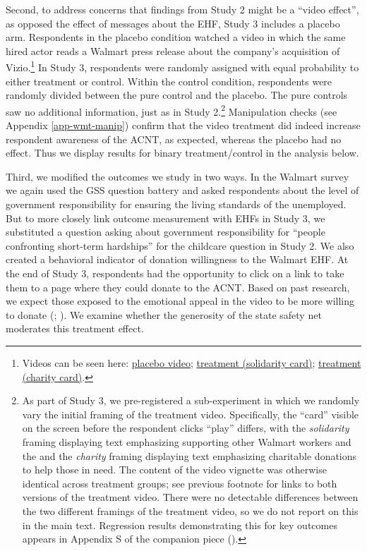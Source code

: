 \documentclass[
  11pt,
  oneside]{article}
\begin{document}
Second, to address concerns that findings from Study 2 might be a ``video effect'', as opposed the effect of messages about the EHF, Study 3 includes a placebo arm. Respondents in the placebo condition watched a video in which the same hired actor reads a Walmart press release about the company's acquisition of Vizio.\footnote{Videos can be seen here: \href{https://tinyurl.com/EHF-Study3-placebo}{placebo video}; \href{https://tinyurl.com/EHFStudy3-solidarity}{treatment (solidarity card)}; \href{https://tinyurl.com/EHF-Study3-charity}{treatment (charity card)}.} In Study 3, respondents were randomly assigned with equal probability to either treatment or control. Within the control condition, respondents were randomly divided between the pure control and the placebo. The pure controls saw no additional information, just as in Study 2.\footnote{As part of Study 3, we pre-registered a sub-experiment in which we randomly vary the initial framing of the treatment video. Specifically, the ``card'' visible on the screen before the respondent clicks ``play'' differs, with the \emph{solidarity} framing displaying text emphasizing supporting other Walmart workers and the and the \emph{charity} framing displaying text emphasizing charitable donations to help those in need. The content of the video vignette was otherwise identical across treatment groups; see previous footnote for links to both versions of the treatment video. There were no detectable differences between the two different framings of the treatment video, so we do not report on this in the main text. Regression results demonstrating this for key outcomes appears in Appendix S of the companion piece ().} Manipulation checks (see Appendix \ref{app-wmt-manip}) confirm that the video treatment did indeed increase respondent awareness of the ACNT, as expected, whereas the placebo had no effect. Thus we display results for binary treatment/control in the analysis below.

Third, we modified the outcomes we study in two ways. In the Walmart survey we again used the GSS question battery and asked respondents about the level of government responsibility for ensuring the living standards of the unemployed. But to more closely link outcome measurement with EHFs in Study 3, we substituted a question asking about government responsibility for ``people confronting short-term hardships'' for the childcare question in Study 2. We also created a behavioral indicator of donation willingness to the Walmart EHF. At the end of Study 3, respondents had the opportunity to click on a link to take them to a page where they could donate to the ACNT. Based on past research, we expect those exposed to the emotional appeal in the video to be more willing to donate (; ). We examine whether the generosity of the state safety net moderates this treatment effect.
\end{document}

